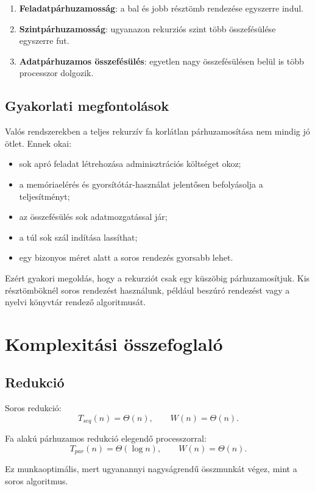 \begin{enumerate}
  \item \textbf{Feladatpárhuzamosság}: a bal és jobb résztömb rendezése egyszerre indul.
  \item \textbf{Szintpárhuzamosság}: ugyanazon rekurziós szint több összefésülése egyszerre fut.
  \item \textbf{Adatpárhuzamos összefésülés}: egyetlen nagy összefésülésen belül is több processzor dolgozik.
\end{enumerate}

\subsection{Gyakorlati megfontolások}

Valós rendszerekben a teljes rekurzív fa korlátlan párhuzamosítása nem mindig jó ötlet. Ennek okai:

\begin{itemize}
  \item sok apró feladat létrehozása adminisztrációs költséget okoz;
  \item a memóriaelérés és gyorsítótár-használat jelentősen befolyásolja a teljesítményt;
  \item az összefésülés sok adatmozgatással jár;
  \item a túl sok szál indítása lassíthat;
  \item egy bizonyos méret alatt a soros rendezés gyorsabb lehet.
\end{itemize}

Ezért gyakori megoldás, hogy a rekurziót csak egy küszöbig párhuzamosítjuk. Kis résztömböknél soros rendezést használunk, például beszúró rendezést vagy a nyelvi könyvtár rendező algoritmusát.

\section{Komplexitási összefoglaló}

\subsection{Redukció}

Soros redukció:
\[
  T_{seq}(n)=\Theta(n),\qquad W(n)=\Theta(n).
\]

Fa alakú párhuzamos redukció elegendő processzorral:
\[
  T_{par}(n)=\Theta(\log n),\qquad W(n)=\Theta(n).
\]

Ez munkaoptimális, mert ugyanannyi nagyságrendű összmunkát végez, mint a soros algoritmus.

